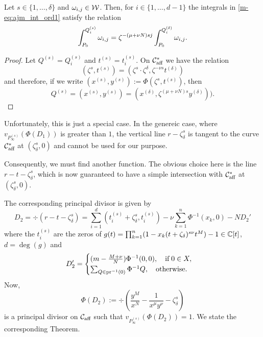 \documentclass[main.tex]{subfiles}
\begin{document}
    \begin{coro}\label{coro:ajm_inf_ord1}
    Let $s \in \{1,\dots,\delta\}$ and $\omega_{i,j} \in \mathcal{W}$. Then, for $i \in \{1,\dots,d-1\}$ the integrals in \eqref{m-eq:ajm_int_ord1} satisfy the relation
    \begin{equation}
     \int_{P_0}^{Q_i^{(s)}} \omega_{i,j} = \zeta^{-(\mu+\nu N)sj} \int_{P_0}^{Q_i^{(\delta)}} \omega_{i,j}.
    \end{equation}
    \end{coro}
    \begin{proof}
    Let $Q^{(s)} = Q_i^{(s)}$ and $t^{(s)} = t_i^{(s)}$. On $\mathcal{C}_{\text{aff}}^{*}$ we have the relation
     \begin{equation}
	\left( \zeta^s,t^{(s)} \right) = \left( \zeta^s \cdot \zeta^{\delta}, \zeta^{-\nu s} t^{(\delta)} \right)
     \end{equation}
     and therefore, if we write $(x^{(s)},y^{(s)}) :=  \Phi( \zeta^s,t^{(s)})$, then
     \begin{equation}
      Q^{(s)} = (x^{(s)},y^{(s)}) = (x^{(\delta)},\zeta^{(\mu+\nu N)s} y^{(\delta)})).
     \end{equation}
    \end{proof}

    \bigskip
    
    Unfortunately, this is just a special case. In the genereic case,  where $v_{P_{\infty}^{(s)}}(\Phi(D_1))$ is greater than $1$,
     the vertical line $r-\zeta_{\delta}^s$ is tangent to the curve $\mathcal{C}_{\text{aff}}^{*}$ 
    at $(\zeta_{\delta}^s,0)$ and cannot be used for our purpose.
    
    Consequently, we must find another function. The obvious choice here is the line $r - t -  \zeta_{\delta}^s$, which
    is now guaranteed to have a simple intersection with $\mathcal{C}_{\text{aff}}^{*}$ 
    at $(\zeta_{\delta}^s,0)$.

    The corresponding principal divisor is given by
     \begin{equation}
      D_2 = \div(r - t - \zeta_{\delta}^s) = \sum_{i = 1}^{d} (t_i^{(s)}+\zeta_{\delta}^s,t_i^{(s)}) - \nu \sum_{k=1}^n
      \Phi^{-1}(x_k,0)- N D_2'
   \end{equation}
      where the $t_i^{(s)}$ are the zeros of $g(t) = \prod_{k=1}^n (1-x_k(t+\zeta_{\delta})^{s\nu}t^M) - 1 \in \mathbb{C}[t]$, $d = \deg(g)$ and
    \begin{equation}
       D_2' = \begin{cases}
	   (m-\frac{M+\nu}{N}) \Phi^{-1}(0,0), \quad \text{if} \; 0 \in X, \\
             \sum_{Q \in \operatorname{pr}^{-1}(0)} \Phi^{-1}Q, \quad \text{otherwise.}
             \end{cases}
    \end{equation}
    Now, 
    \begin{equation}
     \Phi(D_2) := \div \left( \frac{y^M}{x^N} - \frac{1}{x^{\mu}y^{\nu}} - \zeta_{\delta}^s \right)
    \end{equation}
    is a principal divisor on $\mathcal{C}_{\text{aff}}$ such that
    $v_{P_{\infty}^{(s)}}(\Phi(D_2)) = 1$. We state the corresponding Theorem.
    
\end{document}

